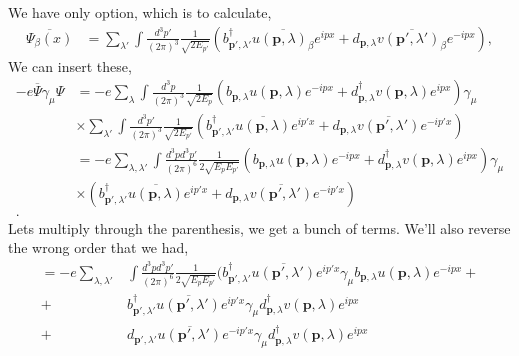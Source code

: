 \documentclass[working, oneside]{../../../Preambles/tuftebook}
\begin{document}
\begin{solution}
We have only option, which is to calculate,
\begin{align*}
    \overline{\Psi_{\beta}\left( x \right) }
&= \sum_{\lambda'} \int \frac{d^3p'}{(2\pi)^3} \frac{1}{\sqrt{2E_{p'}}} \left( b_{\mathbf{p'}, \lambda'}^\dagger \overline{ u(\mathbf{p}, \lambda)_\beta} e^{i p x} + d_{\mathbf{p}, \lambda} \overline{v(\mathbf{p'}, \lambda')_\beta} e^{-i p x} \right), \tag{19}
\end{align*}
We can insert these,
\begin{align*}
    -e \overline{\Psi}\gamma_{\mu }\Psi &= -e\sum_\lambda \int \frac{d^3p}{(2\pi)^3} \frac{1}{\sqrt{2E_p}} \left( b_{\mathbf{p}, \lambda} u(\mathbf{p}, \lambda)e^{-i p x} + d_{\mathbf{p}, \lambda}^\dagger v(\mathbf{p}, \lambda) e^{i p x} \right) \gamma_{\mu } \\
&\times \sum_{\lambda'} \int \frac{d^3p'}{(2\pi)^3} \frac{1}{\sqrt{2E_{p'}}} \left( b_{\mathbf{p'}, \lambda'}^\dagger \overline{ u(\mathbf{p}, \lambda)} e^{i p' x} + d_{\mathbf{p}, \lambda} \overline{v(\mathbf{p'}, \lambda')} e^{-i p' x} \right)\\
&= -e\sum_{\lambda, \lambda'} \int \frac{d^3pd^3p'}{\left( 2\pi \right) ^{6}}\frac{1}{2 \sqrt{E_p E_{p'}}} \left( b_{\mathbf{p}, \lambda} u(\mathbf{p}, \lambda) e^{-i p x} + d_{\mathbf{p}, \lambda}^\dagger v(\mathbf{p}, \lambda) e^{i p x} \right) \gamma_{\mu } \\
&\times \left( b_{\mathbf{p'}, \lambda'}^\dagger \overline{ u(\mathbf{p}, \lambda)} e^{i p' x} + d_{\mathbf{p}, \lambda} \overline{v(\mathbf{p'}, \lambda')} e^{-i p' x} \right)\\
.\end{align*}
Lets multiply through the parenthesis, we get a bunch of terms. We'll also reverse the wrong order that we had,
\begin{align*}
    = -e\sum_{\lambda, \lambda'}& \int \frac{d^3pd^3p'}{\left( 2\pi \right) ^{6}}\frac{1}{2 \sqrt{E_p E_{p'}}}\big(  b_{\mathbf{p'}, \lambda'}^\dagger \overline{ u(\mathbf{p}', \lambda')} e^{i p' x} \gamma_{\mu } b_{\mathbf{p}, \lambda} u(\mathbf{p}, \lambda) e^{-i p x} + \\
    +&  b_{\mathbf{p'}, \lambda'}^\dagger \overline{ u(\mathbf{p}', \lambda')} e^{i p' x} \gamma_{\mu } d_{\mathbf{p}, \lambda}^\dagger v(\mathbf{p}, \lambda) e^{i p x} \\
    +&  d_{\mathbf{p'}, \lambda'} \overline{ u(\mathbf{p}', \lambda')} e^{-i p' x} \gamma_{\mu } d_{\mathbf{p}, \lambda}^\dagger v(\mathbf{p}, \lambda) e^{i p x} \\

\end{align*}
\end{solution}
\end{document}

